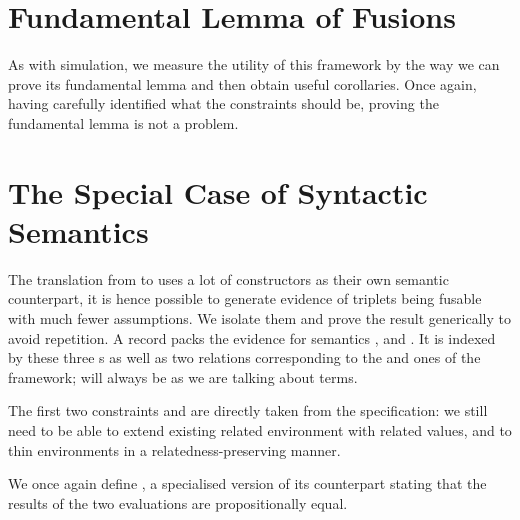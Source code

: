 
\section{Fundamental Lemma of Fusions}

As with simulation, we measure the utility of this framework by the way we can
prove its fundamental lemma and then obtain useful corollaries. Once again,
having carefully identified what the constraints should be, proving the fundamental
lemma is not a problem.


\section{The Special Case of Syntactic Semantics}

The translation from  to  uses a lot of constructors
as their own semantic counterpart, it is hence possible to generate evidence of
 triplets being fusable with much fewer assumptions. We isolate
them and prove the result generically to avoid repetition. A 
record packs the evidence for  semantics ,  and
. It is indexed by these three s as well as two relations
corresponding to the  and  ones of the  framework;
 will always be  as we are talking about terms.


The first two constraints  and  are directly taken
from the  specification: we still need to be able to extend existing related
environment with related values, and to thin environments in a relatedness-preserving manner.


We once again define , a specialised version of its  counterpart stating that
the results of the two evaluations are propositionally equal.


